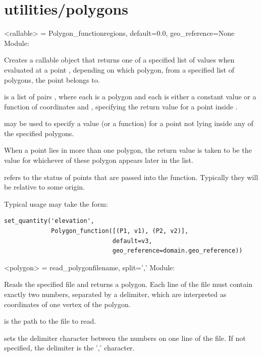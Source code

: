 \documentclass{manual}
\begin{document}
\pagebreak
\section{utilities/polygons}


\begin{classdesc}{<callable> = Polygon_function}{regions,
                                    default=0.0,
                                    geo_reference=None}
Module: 

Creates a callable object that returns one of a specified list of values when
evaluated at a point , depending on which polygon, from a specified list of polygons, the
point belongs to.

 is a list of pairs
, where each  is a polygon and each 
is either a constant value or a function of coordinates 
and , specifying the return value for a point inside .

 may be used to specify a value (or a function)
for a point not lying inside any of the specified polygons.

When a point lies in more than one polygon, the return value is taken to
be the value for whichever of these polygon appears later in the list.


 refers to the status of points
that are passed into the function. Typically they will be relative to
some origin.

Typical usage may take the form:

\begin{verbatim}
set_quantity('elevation',
             Polygon_function([(P1, v1), (P2, v2)],
                              default=v3,
                              geo_reference=domain.geo_reference))
\end{verbatim}
\end{classdesc}

\begin{funcdesc}{<polygon> = read_polygon}{filename, split=','}
Module: 

Reads the specified file and returns a polygon.
Each line of the file must contain exactly two numbers, separated by a delimiter, which are interpreted
as coordinates of one vertex of the polygon.

 is the path to the file to read.

 sets the delimiter character between the numbers on one line of
the file.  If not specified, the delimiter is the ',' character.
\end{funcdesc}
\end{document}
